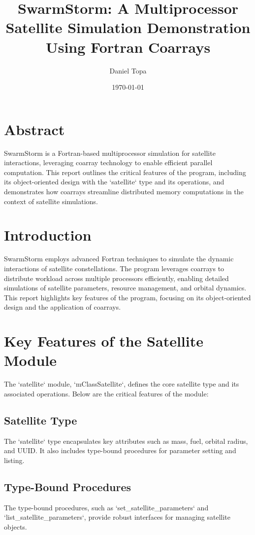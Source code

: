 \documentclass[10pt, oneside]{article}
\title{SwarmStorm: A Multiprocessor Satellite Simulation Demonstration Using Fortran Coarrays}
\author{Daniel Topa}
\date{\today}
\begin{document}
\maketitle

\section*{Abstract}
SwarmStorm is a Fortran-based multiprocessor simulation for satellite interactions, leveraging coarray technology to enable efficient parallel computation. This report outlines the critical features of the program, including its object-oriented design with the `satellite` type and its operations, and demonstrates how coarrays streamline distributed memory computations in the context of satellite simulations.

\tableofcontents
\newpage

\section{Introduction}
SwarmStorm employs advanced Fortran techniques to simulate the dynamic interactions of satellite constellations. The program leverages coarrays to distribute workload across multiple processors efficiently, enabling detailed simulations of satellite parameters, resource management, and orbital dynamics. This report highlights key features of the program, focusing on its object-oriented design and the application of coarrays.

\section{Key Features of the Satellite Module}
The `satellite` module, `mClassSatellite`, defines the core satellite type and its associated operations. Below are the critical features of the module:

\subsection{Satellite Type}
The `satellite` type encapsulates key attributes such as mass, fuel, orbital radius, and UUID. It also includes type-bound procedures for parameter setting and listing.



\subsection{Type-Bound Procedures}
The type-bound procedures, such as `set_satellite_parameters` and `list_satellite_parameters`, provide robust interfaces for managing satellite objects.
\end{document}
